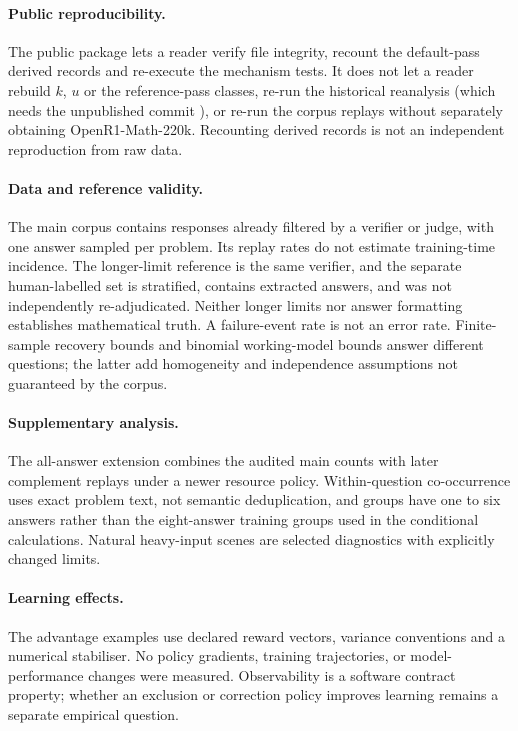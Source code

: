 \documentclass[11pt,a4paper]{article}
\begin{document}
\paragraph{Public reproducibility.} The public package lets a reader verify file integrity, recount the default-pass derived records and re-execute the mechanism tests. It does not let a reader rebuild $k$, $u$ or the reference-pass classes, re-run the historical reanalysis (which needs the unpublished commit ), or re-run the corpus replays without separately obtaining OpenR1-Math-220k. Recounting derived records is not an independent reproduction from raw data.

\paragraph{Data and reference validity.} The main corpus contains responses already filtered by a verifier or judge, with one answer sampled per problem. Its replay rates do not estimate training-time incidence. The longer-limit reference is the same verifier, and the separate human-labelled set is stratified, contains extracted answers, and was not independently re-adjudicated. Neither longer limits nor answer formatting establishes mathematical truth. A failure-event rate is not an error rate. Finite-sample recovery bounds and binomial working-model bounds answer different questions; the latter add homogeneity and independence assumptions not guaranteed by the corpus.

\paragraph{Supplementary analysis.} The all-answer extension combines the audited main counts with later complement replays under a newer resource policy. Within-question co-occurrence uses exact problem text, not semantic deduplication, and groups have one to six answers rather than the eight-answer training groups used in the conditional calculations. Natural heavy-input scenes are selected diagnostics with explicitly changed limits.

\paragraph{Learning effects.} The advantage examples use declared reward vectors, variance conventions and a numerical stabiliser. No policy gradients, training trajectories, or model-performance changes were measured. Observability is a software contract property; whether an exclusion or correction policy improves learning remains a separate empirical question.
\end{document}
